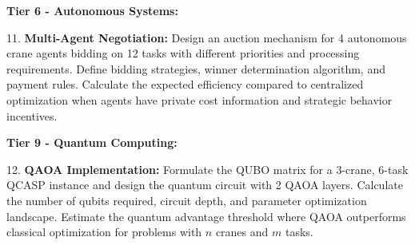 \documentclass{article}
\begin{document}
\textbf{Tier 6 - Autonomous Systems:}

11. \textbf{Multi-Agent Negotiation:} Design an auction mechanism for 4 autonomous crane agents bidding on 12 tasks with different priorities and processing requirements. Define bidding strategies, winner determination algorithm, and payment rules. Calculate the expected efficiency compared to centralized optimization when agents have private cost information and strategic behavior incentives.

\textbf{Tier 9 - Quantum Computing:}

12. \textbf{QAOA Implementation:} Formulate the QUBO matrix for a 3-crane, 6-task QCASP instance and design the quantum circuit with 2 QAOA layers. Calculate the number of qubits required, circuit depth, and parameter optimization landscape. Estimate the quantum advantage threshold where QAOA outperforms classical optimization for problems with $n$ cranes and $m$ tasks.
\end{document}
